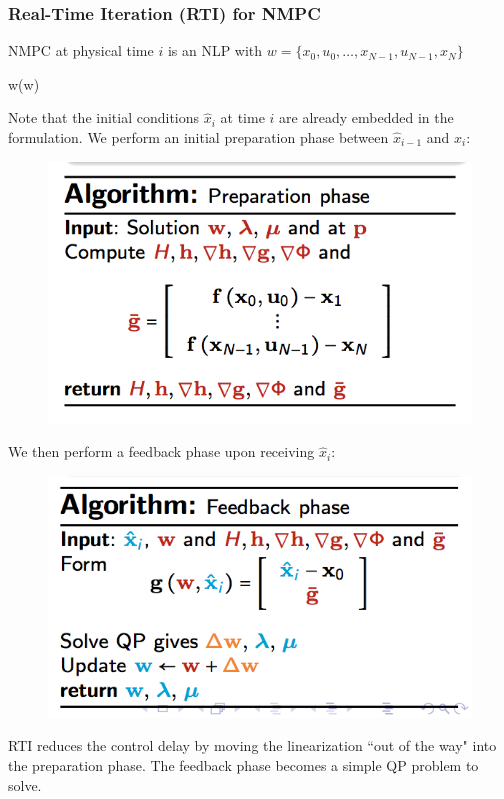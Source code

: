 \documentclass{article}
\theoremstyle{example}
\theoremstyle{definition}
\theoremstyle{assumption}
\theoremstyle{lemma}
\begin{document}
	\subsubsection{Real-Time Iteration (RTI) for NMPC}
	NMPC at physical time $i$ is an NLP with $w=\{x_0,u_0,\ldots,x_{N-1},u_{N-1},x_N\}$
	\begin{mini!}
		{w}{\Phi(w)}{}{}
	\end{mini!}
	Note that the initial conditions $\hat{x}_i$ at time $i$ are already embedded in the formulation.
	We perform an initial preparation phase between $\hat{x}_{i-1}$ and $\hat{x}_i$:
	\begin{figure}[H]
		\centering
		\includegraphics{prep_algo}
	\end{figure} 
	We then perform a feedback phase upon receiving $\hat{x}_i$:
	\begin{figure}[H]
		\centering
		\includegraphics{feedback_algo}
	\end{figure}
	RTI reduces the control delay by moving the linearization ``out of the way" into the preparation phase. 
	The feedback phase becomes a simple QP problem to solve.
\end{document}
